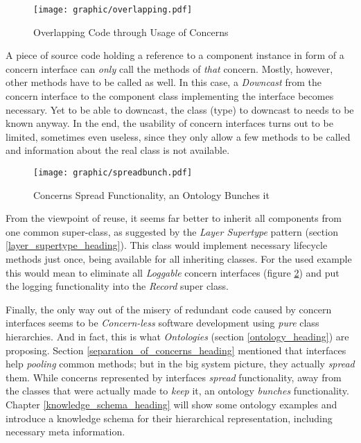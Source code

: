 \begin{figure}[ht]
    \begin{center}
        \texttt{[image: graphic/overlapping.pdf]}
        \caption{Overlapping Code through Usage of Concerns}
        \label{overlapping_figure}
    \end{center}
\end{figure}

A piece of source code holding a reference to a component instance in form of
a concern interface can \emph{only} call the methods of \emph{that} concern.
Mostly, however, other methods have to be called as well. In this case, a
\emph{Downcast} from the concern interface to the component class implementing
the interface becomes necessary. Yet to be able to downcast, the class (type)
to downcast to needs to be known anyway. In the end, the usability of concern
interfaces turns out to be limited, sometimes even useless, since they only
allow a few methods to be called and information about the real class is not
available.

\begin{figure}[ht]
    \begin{center}
        \texttt{[image: graphic/spreadbunch.pdf]}
        \caption{Concerns Spread Functionality, an Ontology Bunches it}
        \label{spreadbunch_figure}
    \end{center}
\end{figure}

From the viewpoint of reuse, it seems far better to inherit all components from
one common super-class, as suggested by the \emph{Layer Supertype} pattern
(section \ref{layer_supertype_heading}). This class would implement necessary
lifecycle methods just once, being available for all inheriting classes. For the
used example this would mean to eliminate all \emph{Loggable} concern interfaces
(figure \ref{spreadbunch_figure}) and put the logging functionality into the
\emph{Record} super class.

Finally, the only way out of the misery of redundant code caused by concern
interfaces seems to be \emph{Concern-less} software development using
\emph{pure} class hierarchies. And in fact, this is what \emph{Ontologies}
(section \ref{ontology_heading}) are proposing. Section
\ref{separation_of_concerns_heading} mentioned that interfaces help
\emph{pooling} common methods; but in the big system picture, they actually
\emph{spread} them. While concerns represented by interfaces \emph{spread}
functionality, away from the classes that were actually made to \emph{keep} it,
an ontology \emph{bunches} functionality. Chapter \ref{knowledge_schema_heading}
will show some ontology examples and introduce a knowledge schema for their
hierarchical representation, including necessary meta information.

